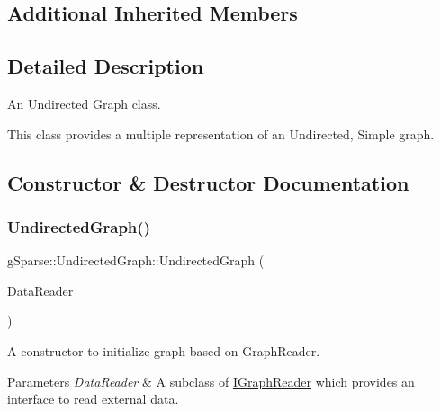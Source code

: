 \subsection*{Additional Inherited Members}


\subsection{Detailed Description}
An Undirected Graph class. 

This class provides a multiple representation of an Undirected, Simple graph. 

\subsection{Constructor \& Destructor Documentation}
\mbox{\label{classg_sparse_1_1_undirected_graph_a3f87a642cb86f46a6a53434598cc1674}} 
\subsubsection{\texorpdfstring{Undirected\+Graph()}{UndirectedGraph()}\hspace{0.1cm}{\footnotesize\ttfamily [1/3]}}
{\footnotesize\ttfamily g\+Sparse\+::\+Undirected\+Graph\+::\+Undirected\+Graph (\begin{DoxyParamCaption}\item[{const g\+Sparse\+::\+Graph\+Reader \&}]{Data\+Reader }\end{DoxyParamCaption})\hspace{0.3cm}{\ttfamily [inline]}}



A constructor to initialize graph based on Graph\+Reader. 


\begin{DoxyParams}{Parameters}
{\em Data\+Reader} & A subclass of \mbox{\hyperlink{classg_sparse_1_1_i_graph_reader}{I\+Graph\+Reader}} which provides an interface to read external data. \\
\hline
\end{DoxyParams}
\mbox{\label{classg_sparse_1_1_undirected_graph_ad9dcd1dd5a47a1f35ee019a007e3cc40}} 
